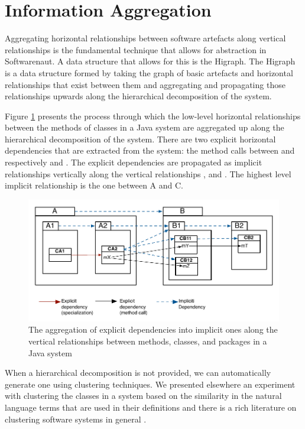 \documentclass[preprint,12pt]{elsarticle}
\begin{document}
\newpage
\section {Information Aggregation}
\label{sec:org}

Aggregating horizontal relationships between software artefacts along vertical relationships is the fundamental technique that allows for abstraction in Softwarenaut. A data structure that allows for this is the Higraph\cite{harel-visform}. The Higraph is a data structure formed by taking the graph of basic artefacts and horizontal relationships that exist between them and aggregating and propagating those relationships upwards along the hierarchical decomposition of the system. 

Figure \ref{dep-agg} presents the process through which the low-level horizontal relationships between the methods of classes in a Java system are aggregated up along the hierarchical decomposition of the system. There are two explicit horizontal dependencies that are extracted from the system: the method calls between  and respectively  and . 
The explicit dependencies are propagated as implicit relationships vertically along the vertical relationships ,  and . The highest level implicit relationship is the one between A and C. 


\begin{figure}[h]
\begin{center}
\includegraphics[width=0.8\linewidth]{images/DependencyAggregation}
\caption{The aggregation of explicit dependencies into implicit ones along the vertical relationships between methods, classes, and packages in a Java system}
\label{dep-agg}
\end{center}
\end{figure}

When a hierarchical decomposition is not provided, we can automatically generate one using clustering techniques. We presented elsewhere an experiment with clustering the classes in a system based on the similarity in the natural language terms that are used in their definitions \cite{Lung05a} and there is a rich literature on clustering software systems in general \cite{koschke-thesis}.
\end{document}
